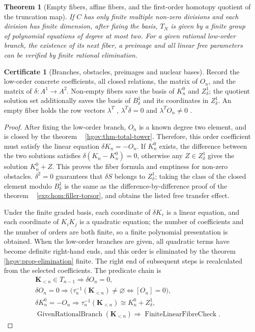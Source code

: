 \documentclass[12pt,a4paper,openany,notitlepage]{report}
\theoremstyle{plain}
\newtheorem{theorem}{Theorem}[chapter]
\theoremstyle{definition}
\newtheorem*{certificate}{Certificate}
\theoremstyle{remark}
\def\mathcal#1{#1}\def\mathsf#1{#1}\def\mathbb#1{#1}%
\begin{document}
\begin{CJK*}
\begin{theorem} [Empty fibers, affine fibers, and the first-order homotopy quotient of the truncation map]
If $C$ has only finite multiple non-zero divisions and each division has finite dimension, after fixing the basis, $\mathcal T_N$ is given by a finite group of polynomial equations of degree at most two. For a given rational low-order branch, the existence of its next fiber, a preimage and all linear free parameters can be verified by finite rational elimination.\end{theorem}
\begin{certificate}
[Branches, obstacles, preimages and nuclear bases]Record the low-order concrete coefficients, all closed relations, the matrix of $O_n$, and the matrix of $\delta:\mathcal A^1\to\mathcal A^2$. Non-empty fibers save the basis of $K_n^0$ and $Z^1_\delta$; the quotient solution set additionally saves the basis of $B^1_\delta$ and its coordinates in $Z^1_\delta$. An empty fiber holds the row vectors $\lambda^{\mathsf T}$ , $\lambda^{\mathsf T}\delta=0$ and $\lambda^{\mathsf T}O_n\ne0$ .\end{certificate}
\begin{proof}
After fixing the low-order branch, $O_n$ is a known degree two element, and is closed by the theorem ~ \ref{hgov:thm-total-tower}. Therefore, this order coefficient must satisfy the linear equation $\delta K_n=-O_n$. If $K_n^0$ exists, the difference between the two solutions satisfies $\delta(K_n-K_n^0)=0$, otherwise any $Z\in Z^1_\delta$ gives the solution $K_n^0+Z$. This proves the fiber formula and emptiness for non-zero obstacles. $\delta^2=0$ guarantees that $\delta S$ belongs to $Z^1_\delta$; taking the class of the closed element modulo $B^1_\delta$ is the same as the difference-by-difference proof of the theorem ~ \ref{exp:hom:filler-torsor}, and obtains the listed free transfer effect.

Under the finite graded basis, each coordinate of $\delta K_r$ is a linear equation, and each coordinate of $K_iK_j$ is a quadratic equation; the number of coefficients and the number of orders are both finite, so a finite polynomial presentation is obtained. When the low-order branches are given, all quadratic terms have become definite right-hand ends, and this order is eliminated by the theorem ~ \ref{hgov:prop-elimination} finite. The right end of subsequent steps is recalculated from the selected coefficients. The predicate chain is \[
 \begin{gathered}
 \mathbf K_{<n}\in\mathcal T_{n-1}
 \Rightarrow \delta O_n=0,\\
 \delta O_n=0
 \Rightarrow
 \bigl(\tau_n^{-1}(\mathbf K_{<n})\ne\varnothing
       \Longleftrightarrow[O_n]=0\bigr),\\
 \delta K_n^0=-O_n
 \Rightarrow
 \tau_n^{-1}(\mathbf K_{<n})\cong K_n^0+Z^1_\delta,\\
 \operatorname{GivenRationalBranch}(\mathbf K_{<n})
 \Rightarrow\operatorname{FiniteLinearFibreCheck}.
 \end{gathered}
\]\end{proof}



\end{CJK*}
\end{document}
